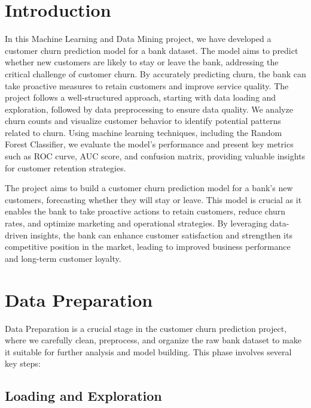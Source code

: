 \documentclass[11pt,a4paper]{article}
\begin{document}


\tableofcontents

\newpage

\section{Introduction}

In this Machine Learning and Data Mining project, we have developed a customer churn prediction model for a bank dataset. The model aims to predict whether new customers are likely to stay or leave the bank, addressing the critical challenge of customer churn. By accurately predicting churn, the bank can take proactive measures to retain customers and improve service quality. The project follows a well-structured approach, starting with data loading and exploration, followed by data preprocessing to ensure data quality. We analyze churn counts and visualize customer behavior to identify potential patterns related to churn. Using machine learning techniques, including the Random Forest Classifier, we evaluate the model's performance and present key metrics such as ROC curve, AUC score, and confusion matrix, providing valuable insights for customer retention strategies.

The project aims to build a customer churn prediction model for a bank's new customers, forecasting whether they will stay or leave. This model is crucial as it enables the bank to take proactive actions to retain customers, reduce churn rates, and optimize marketing and operational strategies. By leveraging data-driven insights, the bank can enhance customer satisfaction and strengthen its competitive position in the market, leading to improved business performance and long-term customer loyalty.

\section{Data Preparation}

Data Preparation is a crucial stage in the customer churn prediction project, where we carefully clean, preprocess, and organize the raw bank dataset to make it suitable for further analysis and model building. This phase involves several key steps: 

\subsection{Loading and Exploration}
\end{document}
